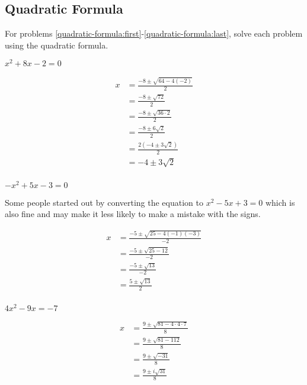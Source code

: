 \documentclass[fleqn,addpoints]{exam}
\begin{document}
\begin{questions}

\section{Quadratic Formula}
For problems \ref{quadratic-formula:first}-\ref{quadratic-formula:last}, solve each problem using the quadratic formula.

\question[10] \( x^2 + 8x - 2 = 0\)
\label{quadratic-formula:first}
\begin{solution}[6 cm]
\begin{align*}
  x &= \frac{-8 \pm \sqrt{64 - 4(-2)}}{2} \\
  &= \frac{-8 \pm \sqrt{72}}{2} \\
  &= \frac{-8 \pm \sqrt{36 \cdot 2}}{2} \\
  &= \frac{-8 \pm 6 \sqrt{2}}{2} \\
  &= \frac{2(-4 \pm 3 \sqrt{2})}{2} \\
  &= -4 \pm 3 \sqrt{2} \\  
\end{align*}
\end{solution}

\question[10] \( -x^2 + 5x - 3 = 0 \)
\begin{solution}[6 cm]
Some people started out by converting the equation to $x^2-5x+3=0$ which is also fine and may make it less likely to
make a mistake with the signs.

\begin{align*}
  x &= \frac{-5 \pm \sqrt{25 - 4(-1)(-3)}}{-2} \\
    &= \frac{-5 \pm \sqrt{25 - 12}}{-2} \\
    &= \frac{-5 \pm \sqrt{13}}{-2} \\
    &= \frac{5 \pm \sqrt{13}}{2} \\
\end{align*}

\end{solution}

\question[10] \( 4x^2 - 9x = -7 \)
\label{quadratic-formula:last}
\begin{solution}[6 cm]
\begin{align*}
  x &= \frac{9 \pm \sqrt{81 - 4 \cdot 4 \cdot 7}}{8} \\
   &= \frac{9 \pm \sqrt{81 - 112}}{8} \\
   &= \frac{9 \pm \sqrt{-31}}{8} \\
   &= \frac{9 \pm i \sqrt{31}}{8} \\
\end{align*}
\end{solution}


\end{questions}
\end{document}
